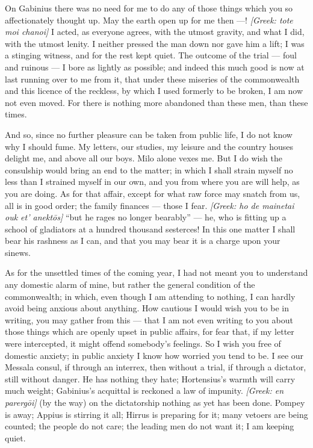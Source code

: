 

 On Gabinius there was no need for me to do any of those things which you so affectionately thought up. May the earth open up for me then ---! \textit{[Greek: tote moi chanoi]} I acted, as everyone agrees, with the utmost gravity, and what I did, with the utmost lenity. I neither pressed the man down nor gave him a lift; I was a stinging witness, and for the rest kept quiet. The outcome of the trial --- foul and ruinous --- I bore as lightly as possible; and indeed this much good is now at last running over to me from it, that under these miseries of the commonwealth and this licence of the reckless, by which I used formerly to be broken, I am now not even moved. For there is nothing more abandoned than these men, than these times.

 And so, since no further pleasure can be taken from public life, I do not know why I should fume. My letters, our studies, my leisure and the country houses delight me, and above all our boys. Milo alone vexes me. But I do wish the consulship would bring an end to the matter; in which I shall strain myself no less than I strained myself in our own, and you from where you are will help, as you are doing. As for that affair, except for what raw force may snatch from us, all is in good order; the family finances --- those I fear. \textit{[Greek: ho de mainetai ouk et' anekt\=os]} ``but he rages no longer bearably'' --- he, who is fitting up a school of gladiators at a hundred thousand sesterces! In this one matter I shall bear his rashness as I can, and that you may bear it is a charge upon your sinews.

 As for the unsettled times of the coming year, I had not meant you to understand any domestic alarm of mine, but rather the general condition of the commonwealth; in which, even though I am attending to nothing, I can hardly avoid being anxious about anything. How cautious I would wish you to be in writing, you may gather from this --- that I am not even writing to you about those things which are openly upset in public affairs, for fear that, if my letter were intercepted, it might offend somebody's feelings. So I wish you free of domestic anxiety; in public anxiety I know how worried you tend to be. I see our Messala consul, if through an interrex, then without a trial, if through a dictator, still without danger. He has nothing they hate; Hortensius's warmth will carry much weight; Gabinius's acquittal is reckoned a law of impunity. \textit{[Greek: en parerg\=oi]} (by the way) on the dictatorship nothing as yet has been done. Pompey is away; Appius is stirring it all; Hirrus is preparing for it; many vetoers are being counted; the people do not care; the leading men do not want it; I am keeping quiet.

